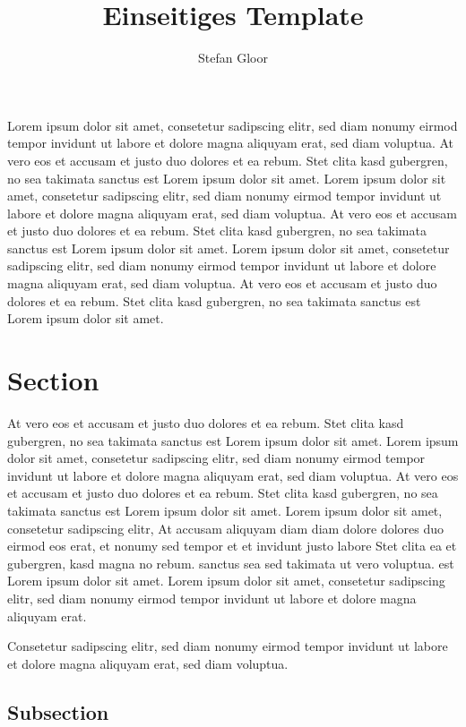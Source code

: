 \documentclass[a4paper]{article}
\title{\vspace{-3cm}\textbf{Einseitiges Template}}
\author{Stefan Gloor}
\begin{document}
\maketitle
\thispagestyle{TitlePageStyle}


Lorem ipsum dolor sit amet, consetetur sadipscing elitr, sed diam nonumy eirmod tempor invidunt ut labore et dolore magna aliquyam erat, sed diam voluptua. At vero eos et accusam et justo duo dolores et ea rebum. Stet clita kasd gubergren, no sea takimata sanctus est Lorem ipsum dolor sit amet. Lorem ipsum dolor sit amet, consetetur sadipscing elitr, sed diam nonumy eirmod tempor invidunt ut labore et dolore magna aliquyam erat, sed diam voluptua. At vero eos et accusam et justo duo dolores et ea rebum. Stet clita kasd gubergren, no sea takimata sanctus est Lorem ipsum dolor sit amet. Lorem ipsum dolor sit amet, consetetur sadipscing elitr, sed diam nonumy eirmod tempor invidunt ut labore et dolore magna aliquyam erat, sed diam voluptua. At vero eos et accusam et justo duo dolores et ea rebum. Stet clita kasd gubergren, no sea takimata sanctus est Lorem ipsum dolor sit amet.   


\section{Section}

At vero eos et accusam et justo duo dolores et ea rebum. Stet clita kasd gubergren, no sea takimata sanctus est Lorem ipsum dolor sit amet. Lorem ipsum dolor sit amet, consetetur sadipscing elitr, sed diam nonumy eirmod tempor invidunt ut labore et dolore magna aliquyam erat, sed diam voluptua. At vero eos et accusam et justo duo dolores et ea rebum. Stet clita kasd gubergren, no sea takimata sanctus est Lorem ipsum dolor sit amet. Lorem ipsum dolor sit amet, consetetur sadipscing elitr, At accusam aliquyam diam diam dolore dolores duo eirmod eos erat, et nonumy sed tempor et et invidunt justo labore Stet clita ea et gubergren, kasd magna no rebum. sanctus sea sed takimata ut vero voluptua. est Lorem ipsum dolor sit amet. Lorem ipsum dolor sit amet, consetetur sadipscing elitr, sed diam nonumy eirmod tempor invidunt ut labore et dolore magna aliquyam erat.   

Consetetur sadipscing elitr, sed diam nonumy eirmod tempor invidunt ut labore et dolore magna aliquyam erat, sed diam voluptua. 

    \subsection{Subsection}
\end{document}
